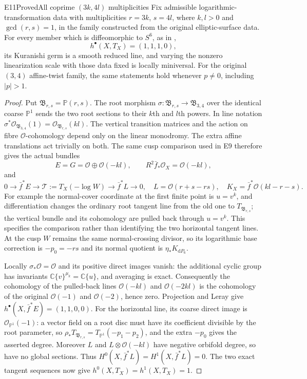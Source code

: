 \begin{statement}{E11}{Proved}{All coprime $(3k,4l)$ multiplicities}
Fix admissible logarithmic-transformation data with multiplicities
$r=3k$, $s=4l$, where $k,l>0$ and $\gcd(r,s)=1$, in the family
constructed from the original elliptic-surface data. For every member
which is diffeomorphic to $S^6$, as in
\cite[Theorem labelled \texttt{t:main}]{Viaclovsky2026Log},
\[
 h^\bullet(X,T_X)=(1,1,1,0),
\]
its Kuranishi germ is a smooth reduced line, and varying the nonzero
linearization scale with those data fixed is locally miniversal.
For the original $(3,4)$ affine-twist family, the same statements
hold whenever $p\ne0$, including $|p|>1$.
\end{statement}
\begin{proof}
Put $\mathfrak B_{r,s}=\mathbb P(r,s)$. The root morphism
$\sigma:\mathfrak B_{r,s}\to\mathfrak B_{3,4}$ over the identical
coarse $\mathbb P^1$ sends the two root sections to their $k$th and
$l$th powers. In line notation
$\sigma^*\mathcal O_{\mathfrak B_{3,4}}(1)
=\mathcal O_{\mathfrak B_{r,s}}(kl)$.
The vertical transition matrices and the action on fibre
$\mathcal O$-cohomology depend only on the linear monodromy.
The extra affine translations act trivially on both. The same
cusp comparison used in E9 therefore gives the actual bundles
\[
 E=G=\mathcal O\oplus\mathcal O(-kl),\qquad
 R^2\bar f_*\mathcal O_X=\mathcal O(-kl),
\]
and
\[
0\to\bar f^*E\to\mathcal T:=T_X(-\log W)
 \to\bar f^*L\to0,
\quad L=\mathcal O(r+s-rs),
\quad K_X=\bar f^*\mathcal O(kl-r-s).
\]
For example the normal-cover coordinate at the first finite point
is $u=v^k$, and differentiation changes the ordinary root tangent
line from the old one to $T_{\mathfrak B_{r,s}}$; the vertical
bundle and its cohomology are pulled back through $u=v^k$.
This specifies the comparison rather than identifying the two
horizontal tangent lines. At the cusp $W$ remains the same
normal-crossing divisor, so its logarithmic base correction is
$-p_0=-rs$ and its normal quotient is $\eta_*K_{\mathrm dP_6}$.

Locally $\sigma_*\mathcal O=\mathcal O$ and its positive direct
images vanish: the additional cyclic group has invariants
$\mathbb C\{v\}^{\mu_k}=\mathbb C\{u\}$, and averaging is
exact. Consequently the cohomology of the pulled-back lines
$\mathcal O(-kl)$ and $\mathcal O(-2kl)$ is the cohomology of
the original $\mathcal O(-1)$ and $\mathcal O(-2)$, hence zero.
Projection and Leray give
$h^\bullet(X,\bar f^*E)=(1,1,0,0)$.
For the horizontal line, its coarse direct image is
$\mathcal O_{\mathbb P^1}(-1)$: a vector field on a root disc
must have its coefficient divisible by the root parameter,
so $\rho_*T_{\mathfrak B_{r,s}}=T_{\mathbb P^1}(-p_1-p_2)$,
and the extra $-p_0$ gives the asserted degree. Moreover
$L$ and $L\otimes\mathcal O(-kl)$ have negative orbifold degree,
so have no global sections. Thus
$H^0(X,\bar f^*L)=H^1(X,\bar f^*L)=0$.
The two exact tangent sequences now give
$h^0(X,T_X)=h^1(X,T_X)=1$.


\end{proof}
